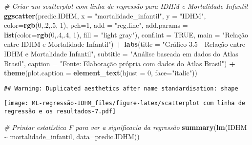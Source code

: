 \documentclass[
]{article}
\newenvironment{Shaded}{\begin{snugshade}}{\end{snugshade}}
\newcommand{\AttributeTok}[1]{\textcolor[rgb]{0.13,0.29,0.53}{#1}}
\newcommand{\CommentTok}[1]{\textcolor[rgb]{0.56,0.35,0.01}{\textit{#1}}}
\newcommand{\ConstantTok}[1]{\textcolor[rgb]{0.56,0.35,0.01}{#1}}
\newcommand{\DecValTok}[1]{\textcolor[rgb]{0.00,0.00,0.81}{#1}}
\newcommand{\FunctionTok}[1]{\textcolor[rgb]{0.13,0.29,0.53}{\textbf{#1}}}
\newcommand{\NormalTok}[1]{#1}
\newcommand{\SpecialCharTok}[1]{\textcolor[rgb]{0.81,0.36,0.00}{\textbf{#1}}}
\newcommand{\StringTok}[1]{\textcolor[rgb]{0.31,0.60,0.02}{#1}}
\begin{document}
\begin{Shaded}
\begin{Highlighting}[]
\CommentTok{\# Criar um scatterplot com linha de regressão para IDHM e Mortalidade Infantil}
\FunctionTok{ggscatter}\NormalTok{(predic.IDHM, }\AttributeTok{x =} \StringTok{"mortalidade\_infantil"}\NormalTok{, }\AttributeTok{y =} \StringTok{"IDHM"}\NormalTok{, }
          \AttributeTok{color=}\FunctionTok{rgb}\NormalTok{(}\DecValTok{0}\NormalTok{,.}\DecValTok{2}\NormalTok{,.}\DecValTok{5}\NormalTok{,  }\DecValTok{1}\NormalTok{), }\AttributeTok{pch=}\DecValTok{1}\NormalTok{, }\AttributeTok{add =} \StringTok{"reg.line"}\NormalTok{, }
          \AttributeTok{add.params =} \FunctionTok{list}\NormalTok{(}\AttributeTok{color=}\FunctionTok{rgb}\NormalTok{(}\DecValTok{0}\NormalTok{,.}\DecValTok{4}\NormalTok{,.}\DecValTok{4}\NormalTok{,  }\DecValTok{1}\NormalTok{), }\AttributeTok{fill =} \StringTok{"light gray"}\NormalTok{), }
          \AttributeTok{conf.int =} \ConstantTok{TRUE}\NormalTok{, }\AttributeTok{main =} \StringTok{"Relação entre IDHM e Mortalidade Infantil"}\NormalTok{) }\SpecialCharTok{+}
  \FunctionTok{labs}\NormalTok{(}\AttributeTok{title =} \StringTok{"Gráfico 3.5 {-} Relação entre IDHM e Mortalidade Infantil"}\NormalTok{,}
       \AttributeTok{subtitle =} \StringTok{"Análise baseada em dados do Atlas Brasil"}\NormalTok{,}
       \AttributeTok{caption =} \StringTok{"Fonte: Elaboração própria com dados do Atlas Brasil"}\NormalTok{) }\SpecialCharTok{+}
  \FunctionTok{theme}\NormalTok{(}\AttributeTok{plot.caption =} \FunctionTok{element\_text}\NormalTok{(}\AttributeTok{hjust =} \DecValTok{0}\NormalTok{, }\AttributeTok{face=}\StringTok{"italic"}\NormalTok{))}
\end{Highlighting}
\end{Shaded}

\begin{verbatim}
## Warning: Duplicated aesthetics after name standardisation: shape
\end{verbatim}

\texttt{[image: ML-regressão-IDHM\_files/figure-latex/scatterplot com linha de regressão e os resultados-7.pdf]}

\begin{Shaded}
\begin{Highlighting}[]
\CommentTok{\# Printar estatística F para ver a significacia da regressão}
\FunctionTok{summary}\NormalTok{(}\FunctionTok{lm}\NormalTok{(IDHM }\SpecialCharTok{\textasciitilde{}}\NormalTok{ mortalidade\_infantil, }\AttributeTok{data=}\NormalTok{predic.IDHM))}
\end{Highlighting}
\end{Shaded}
\end{document}
